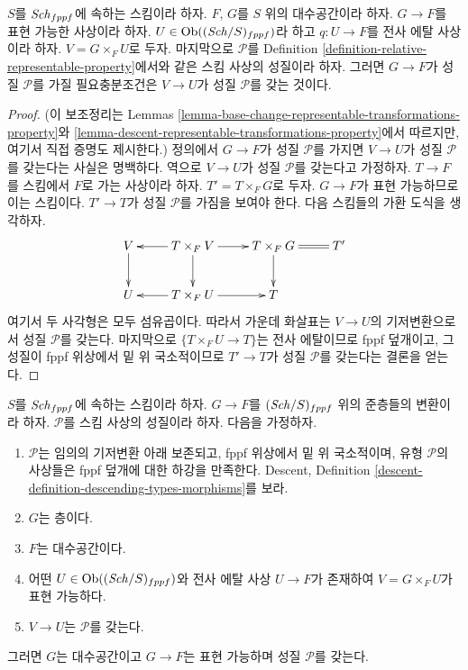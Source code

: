 \begin{lemma}
\label{lemma-representable-morphisms-spaces-property}
$S$를 $\mathit{Sch}_{fppf}$에 속하는 스킴이라 하자.
$F$, $G$를 $S$ 위의 대수공간이라 하자.
$G \to F$를 표현 가능한 사상이라 하자.
$U \in \mathop{\mathrm{Ob}}\nolimits((\mathit{Sch}/S)_{fppf})$라 하고 $q : U \to F$를 전사 에탈 사상이라
하자. $V = G \times_F U$로 두자. 마지막으로 $\mathcal{P}$를 Definition
\ref{definition-relative-representable-property}에서와 같은 스킴 사상의
성질이라 하자. 그러면 $G \to F$가 성질 $\mathcal{P}$를 가질
필요충분조건은 $V \to U$가 성질 $\mathcal{P}$를 갖는 것이다.
\end{lemma}

\begin{proof}
(이 보조정리는 Lemmas
\ref{lemma-base-change-representable-transformations-property}와
\ref{lemma-descent-representable-transformations-property}에서
따르지만, 여기서 직접 증명도 제시한다.)
정의에서 $G \to F$가 성질 $\mathcal{P}$를 가지면
$V \to U$가 성질 $\mathcal{P}$를 갖는다는 사실은 명백하다.
역으로 $V \to U$가 성질 $\mathcal{P}$를 갖는다고 가정하자.
$T \to F$를 스킴에서 $F$로 가는 사상이라 하자.
$T' = T \times_F G$로 두자. $G \to F$가 표현 가능하므로 이는 스킴이다.
$T' \to T$가 성질 $\mathcal{P}$를 가짐을 보여야 한다.
다음 스킴들의 가환 도식을 생각하자.
$$
\xymatrix{
V \ar[d] & T \times_F V \ar[d] \ar[l] \ar[r] &
T \times_F G \ar[d] \ar@{=}[r] & T' \\
U & T \times_F U \ar[l] \ar[r] & T
}
$$
여기서 두 사각형은 모두 섬유곱이다. 따라서 가운데 화살표는
$V \to U$의 기저변환으로서 성질 $\mathcal{P}$를 갖는다.
마지막으로 $\{T \times_F U \to T\}$는 전사 에탈이므로 fppf 덮개이고,
그 성질이 fppf 위상에서 밑 위 국소적이므로
$T' \to T$가 성질 $\mathcal{P}$를 갖는다는 결론을 얻는다.
\end{proof}

\begin{lemma}
\label{lemma-morphism-sheaves-with-P-effective-descent-etale}
$S$를 $\mathit{Sch}_{fppf}$에 속하는 스킴이라 하자.
$G \to F$를 $(\mathit{Sch}/S)_{fppf}$ 위의 준층들의 변환이라 하자.
$\mathcal{P}$를 스킴 사상의 성질이라 하자.
다음을 가정하자.
\begin{enumerate}
\item $\mathcal{P}$는 임의의 기저변환 아래 보존되고, fppf 위상에서
밑 위 국소적이며, 유형 $\mathcal{P}$의 사상들은 fppf 덮개에 대한
하강을 만족한다. Descent, Definition
\ref{descent-definition-descending-types-morphisms}를 보라.
\item $G$는 층이다.
\item $F$는 대수공간이다.
\item 어떤 $U \in \mathop{\mathrm{Ob}}\nolimits((\mathit{Sch}/S)_{fppf})$와 전사 에탈 사상
$U \to F$가 존재하여 $V = G \times_F U$가 표현 가능하다.
\item $V \to U$는 $\mathcal{P}$를 갖는다.
\end{enumerate}
그러면 $G$는 대수공간이고 $G \to F$는 표현 가능하며 성질
$\mathcal{P}$를 갖는다.
\end{lemma}

